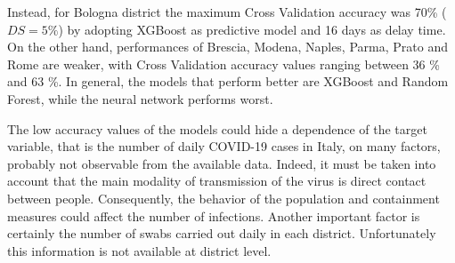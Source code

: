 \documentclass[review]{elsarticle}
\begin{document}
Instead, for Bologna district the maximum Cross Validation accuracy was 70\% ($ DS = 5 \% $) by adopting XGBoost as predictive model and 16 days as delay time.
On the other hand, performances of Brescia, Modena, Naples, Parma, Prato and Rome are weaker, with Cross Validation accuracy values ranging between 36 \% and 63 \%. In general, the models that perform better are XGBoost and Random Forest, while the neural network performs worst. %

The low accuracy values of the models could hide a dependence of the target variable, that is the number of daily COVID-19 cases in Italy, on many factors, probably not observable from the available data. Indeed, it must be taken into account that the main modality of transmission of the virus is direct contact between people. Consequently, the behavior of the population and containment measures could affect the number of infections. Another important factor is certainly the number of swabs carried out daily in each district. Unfortunately this information is not available at district level.
\end{document}
